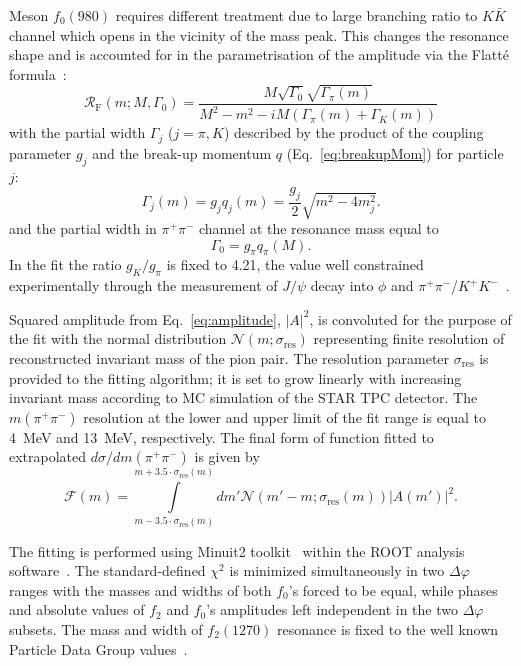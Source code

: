 Meson $f_0(980)$ requires different treatment due to large branching ratio to $K\bar{K}$ channel which opens in the vicinity of the mass peak. This changes the resonance shape and is accounted for in the parametrisation of the amplitude via the Flatt\'e formula~\cite{Flatte}:
\begin{equation}\label{eq:Flatte}\mathcal{R}_{\textrm{F}}(m;M,\Gamma_{0}) = \frac{M\sqrt{\Gamma_{0}}\sqrt{\Gamma_{\pi}(m)}}{M^{2}-m^{2}-i M\left(\Gamma_{\pi}(m)+\Gamma_{K}(m)\right)}\end{equation}
%
with the partial width $\Gamma_{j}$ ($j=\pi, K$) described by the product of the coupling parameter $g_{j}$ and the break-up momentum $q$ (Eq.~\eqref{eq:breakupMom}) for particle $j$:
\begin{equation}
    \Gamma_{j}(m) = g_{j}q_{j}(m) = \frac{g_{j}}{2}\sqrt{m^{2}-4m_{j}^{2}}.
\end{equation} and the partial width in $\pi^{+}\pi^{-}$ channel at the resonance mass equal to
\begin{equation}
    \Gamma_{0} = g_{\pi}q_{\pi}(M).
\end{equation}
In the fit the ratio $g_{K}/g_{\pi}$ is fixed to 4.21, the value well constrained experimentally through the measurement of $J/\psi$ decay into $\phi$ and $\pi^{+}\pi^{-}$/$K^{+}K^{-}$~\cite{BES_JPsi}.
%

Squared amplitude from Eq.~\eqref{eq:amplitude}, $|A|^{2}$, is convoluted for the purpose of the fit with the normal distribution $\mathcal{N}(m; \sigma_{\text{res}})$ representing finite resolution of reconstructed invariant mass of the pion pair. The resolution parameter $\sigma_{\text{res}}$ is provided to the fitting algorithm; it is set to grow linearly with increasing invariant mass according to MC simulation of the STAR TPC detector. The $m(\pi^{+}\pi^{-})$ resolution at the lower and upper limit of the fit range is equal to 4~MeV and 13~MeV, respectively. The final form of function fitted to extrapolated $d\sigma/dm(\pi^{+}\pi^{-})$ is given by
\begin{equation}
    \mathcal{F}(m) = \int\limits_{m-3.5\cdot\sigma_{\text{res}}(m)}^{m+3.5\cdot\sigma_{\text{res}}(m)}dm'\mathcal{N}\left(m'-m; \sigma_{\text{res}}(m)\right)|A(m')|^{2}.
\end{equation}

The fitting is performed using Minuit2 toolkit~\cite{Minuit2} within the ROOT analysis software~\cite{ROOT}. The standard-defined $\chi^{2}$ is minimized simultaneously in two $\Delta\varphi$ ranges with the masses and widths of both $f_0$'s forced to be equal, while phases and absolute values of $f_2$ and $f_0$'s amplitudes left independent in the two $\Delta\varphi$ subsets. The mass and width of $f_2(1270)$ resonance is fixed to the well known Particle Data Group values~\cite{pdg}.
%

